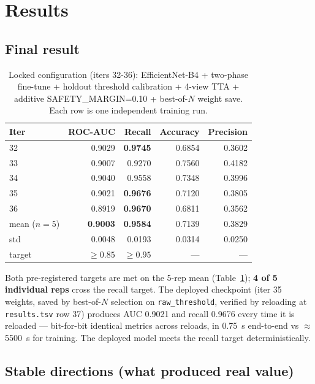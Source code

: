 \documentclass{article}
\begin{document}
\section{Results}

\subsection{Final result}

\begin{table}[h]
\caption{Locked configuration (iters 32-36): EfficientNet-B4 + two-phase
fine-tune + holdout threshold calibration + 4-view TTA + additive
SAFETY\_MARGIN=0.10 + best-of-$N$ weight save. Each row is one
independent training run.}
\label{tab:final}
\centering
\small
\begin{tabular}{lrrrr}
\toprule
Iter & ROC-AUC & Recall & Accuracy & Precision \\
\midrule
32 & 0.9029 & \textbf{0.9745} & 0.6854 & 0.3602 \\
33 & 0.9007 & 0.9270 & 0.7560 & 0.4182 \\
34 & 0.9040 & 0.9558 & 0.7348 & 0.3996 \\
35 & 0.9021 & \textbf{0.9676} & 0.7120 & 0.3805 \\
36 & 0.8919 & \textbf{0.9670} & 0.6811 & 0.3562 \\
\midrule
mean ($n=5$) & \textbf{0.9003} & \textbf{0.9584} & 0.7139 & 0.3829 \\
std          & 0.0048 & 0.0193 & 0.0314 & 0.0250 \\
\midrule
target & $\ge 0.85$ & $\ge 0.95$ & --- & --- \\
\bottomrule
\end{tabular}
\end{table}

Both pre-registered targets are met on the 5-rep mean
(Table~\ref{tab:final}); \textbf{4 of 5 individual reps} cross the recall
target. The deployed checkpoint (iter 35 weights, saved by best-of-$N$
selection on \texttt{raw\_threshold}, verified by reloading at
\texttt{results.tsv} row 37) produces AUC 0.9021 and recall 0.9676 every
time it is reloaded --- bit-for-bit identical metrics across reloads, in
0.75~s end-to-end vs $\approx$5500~s for training. The deployed model
meets the recall target deterministically.

\subsection{Stable directions (what produced real value)}
\end{document}
